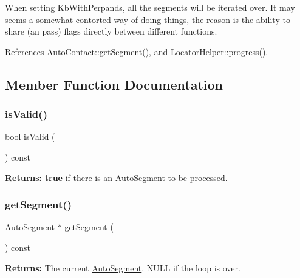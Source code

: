 When setting Kb\+With\+Perpands, all the segments will be iterated over. It may seems a somewhat contorted way of doing things, the reason is the ability to share (an pass) flags directly between different functions. 

References Auto\+Contact\+::get\+Segment(), and Locator\+Helper\+::progress().



\subsection{Member Function Documentation}
\mbox{\label{classKatabatic_1_1LocatorHelper_a5bc2a781be2586924afce4e4a4ea6697}} 
\subsubsection{\texorpdfstring{is\+Valid()}{isValid()}}
{\footnotesize\ttfamily bool is\+Valid (\begin{DoxyParamCaption}{ }\end{DoxyParamCaption}) const\hspace{0.3cm}{\ttfamily [inline]}}

{\bfseries Returns\+:} {\bfseries true} if there is an \mbox{\hyperlink{classKatabatic_1_1AutoSegment}{Auto\+Segment}} to be processed. \mbox{\label{classKatabatic_1_1LocatorHelper_ad0f8becc4187c833b6f6c5f902f8aaa5}} 
\subsubsection{\texorpdfstring{get\+Segment()}{getSegment()}}
{\footnotesize\ttfamily \mbox{\hyperlink{classKatabatic_1_1AutoSegment}{Auto\+Segment}} $\ast$ get\+Segment (\begin{DoxyParamCaption}{ }\end{DoxyParamCaption}) const\hspace{0.3cm}{\ttfamily [inline]}}

{\bfseries Returns\+:} The current \mbox{\hyperlink{classKatabatic_1_1AutoSegment}{Auto\+Segment}}. {\ttfamily N\+U\+LL} if the loop is over. 

